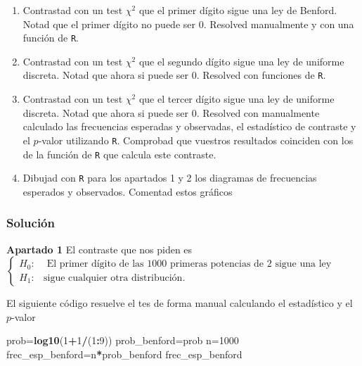 \documentclass[
]{article}
\newenvironment{Shaded}{\begin{snugshade}}{\end{snugshade}}
\newcommand{\DecValTok}[1]{\textcolor[rgb]{0.00,0.00,0.81}{#1}}
\newcommand{\KeywordTok}[1]{\textcolor[rgb]{0.13,0.29,0.53}{\textbf{#1}}}
\newcommand{\NormalTok}[1]{#1}
\newcommand{\OperatorTok}[1]{\textcolor[rgb]{0.81,0.36,0.00}{\textbf{#1}}}
\providecommand{\tightlist}{%
  \setlength{\itemsep}{0pt}\setlength{\parskip}{0pt}}
\begin{document}
\begin{enumerate}
\def\labelenumi{\arabic{enumi}.}
\tightlist
\item
  Contrastad con un test \(\chi^2\) que el primer dígito sigue una ley
  de Benford. Notad que el primer dígito no puede ser 0. Resolved
  manualmente y con una función de \texttt{R}.\\
\item
  Contrastad con un test \(\chi^2\) que el segundo dígito sigue una ley
  de uniforme discreta. Notad que ahora si puede ser 0. Resolved con
  funciones de \texttt{R}.\\
\item
  Contrastad con un test \(\chi^2\) que el tercer dígito sigue una ley
  de uniforme discreta. Notad que ahora si puede ser 0. Resolved con
  manualmente calculado las frecuencias esperadas y observadas, el
  estadístico de contraste y el \(p\)-valor utilizando \texttt{R}.
  Comprobad que vuestros resultados coinciden con los de la función de
  \texttt{R} que calcula este contraste.\\
\item
  Dibujad con \texttt{R} para los apartados 1 y 2 los diagramas de
  frecuencias esperados y observados. Comentad estos gráficos
\end{enumerate}

\hypertarget{soluciuxf3n-2}{%
\subsubsection{Solución}\label{soluciuxf3n-2}}

\textbf{Apartado 1} El contraste que nos piden es \[
\left\{
\begin{array}{ll}
H_0: &  \mbox{ El primer dígito de las 1000 primeras potencias de 2 sigue una ley Benford,}\\
H_1: & \mbox{sigue cualquier otra distribución}.
\end{array}
\right.
\]

El siguiente código resuelve el tes de forma manual calculando el
estadístico y el \(p\)-valor

\begin{Shaded}
\begin{Highlighting}[]
\NormalTok{prob=}\KeywordTok{log10}\NormalTok{(}\DecValTok{1}\OperatorTok{+}\DecValTok{1}\OperatorTok{/}\NormalTok{(}\DecValTok{1}\OperatorTok{:}\DecValTok{9}\NormalTok{))}
\NormalTok{prob\_benford=prob}
\NormalTok{n=}\DecValTok{1000}
\NormalTok{frec\_esp\_benford=n}\OperatorTok{*}\NormalTok{prob\_benford}
\NormalTok{frec\_esp\_benford}
\end{Highlighting}
\end{Shaded}
\end{document}
